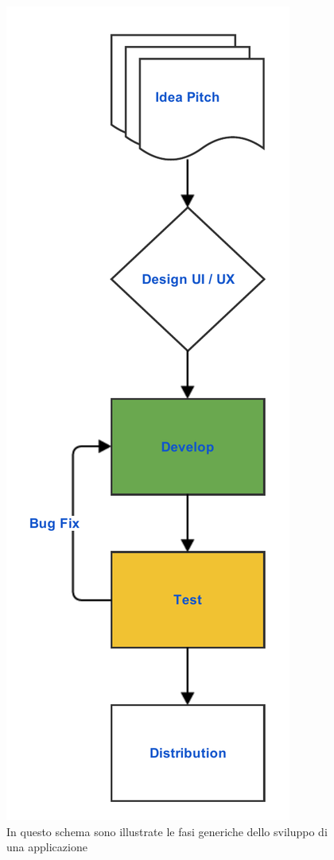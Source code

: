 \begin{figure}
	\begin{center}
		\includegraphics[scale=0.5]{Figures/classic_app_flow.pdf}
		\caption[Schema generale]{In questo schema sono illustrate le fasi generiche dello sviluppo di una applicazione}
		\label{fig:classic_app_flow}
	\end{center}
\end{figure}

